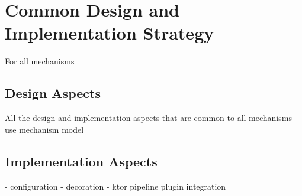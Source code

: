 \chapter{Common Design and Implementation Strategy}\label{ch:design-implementation}

For all mechanisms


\section{Design Aspects}\label{sec:design-aspects}

All the design and implementation aspects that are common to all mechanisms
- use mechanism model


\section{Implementation Aspects}\label{sec:implementation-aspects}

- configuration
- decoration
- ktor pipeline plugin integration
